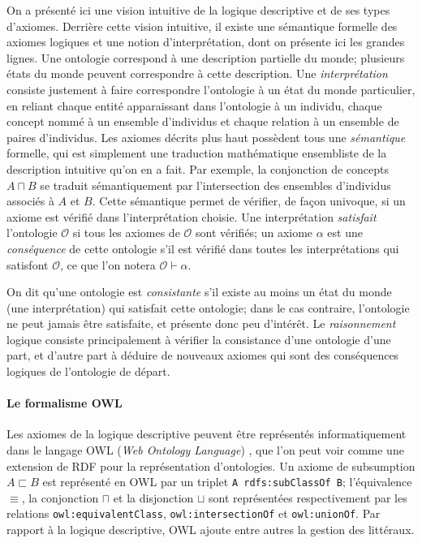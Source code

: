 On a présenté ici une vision intuitive de la logique descriptive et de ses types d'axiomes. Derrière cette vision intuitive, il existe une sémantique formelle des axiomes logiques et une notion d'interprétation, dont on présente ici les grandes lignes.
Une ontologie correspond à une description partielle du monde; plusieurs états du monde peuvent correspondre à cette description. Une \textit{interprétation} consiste justement à faire correspondre l'ontologie à un état du monde particulier, en reliant chaque entité apparaissant dans l'ontologie à un individu, chaque concept nommé à un ensemble d'individus et chaque relation à un ensemble de paires d'individus. Les axiomes décrits plus haut possèdent tous une \textit{sémantique} formelle, qui est simplement une traduction mathématique ensembliste de la description intuitive qu'on en a fait. Par exemple, la conjonction de concepts $A \sqcap B$ se traduit sémantiquement par l'intersection des ensembles d'individus associés à $A$ et $B$. Cette sémantique permet de vérifier, de façon univoque, si un axiome est vérifié dans l'interprétation choisie. Une interprétation \textit{satisfait} l'ontologie $\mathcal{O}$ si tous les axiomes de $\mathcal{O}$ sont vérifiés; un axiome $\alpha$ est une \textit{conséquence} de cette ontologie s'il est vérifié dans toutes les interprétations qui satisfont $\mathcal{O}$, ce que l'on notera $\mathcal{O} \vdash \alpha$.

On dit qu'une ontologie est \textit{consistante} s'il existe au moins un état du monde (une interprétation) qui satisfait cette ontologie; dans le cas contraire, l'ontologie ne peut jamais être satisfaite, et présente donc peu d'intérêt. Le \textit{raisonnement} logique consiste principalement à vérifier la consistance d'une ontologie d'une part, et d'autre part à déduire de nouveaux axiomes qui sont des conséquences logiques de l'ontologie de départ.


\paragraph{Le formalisme OWL}

Les axiomes de la logique descriptive peuvent être représentés informatiquement dans le langage OWL (\textit{Web Ontology Language}) \cite{Hitzler:12:OWO}, que l'on peut voir comme une extension de RDF pour la représentation d'ontologies. Un axiome de subsumption $A \sqsubset B$ est représenté en OWL par un triplet \texttt{A rdfs:subClassOf B}; l'équivalence $\equiv$, la conjonction $\sqcap$ et la disjonction $\sqcup$ sont représentées respectivement par les relations \texttt{owl:equivalentClass}, \texttt{owl:intersectionOf} et \texttt{owl:unionOf}. Par rapport à la logique descriptive, OWL ajoute entre autres la gestion des littéraux.

